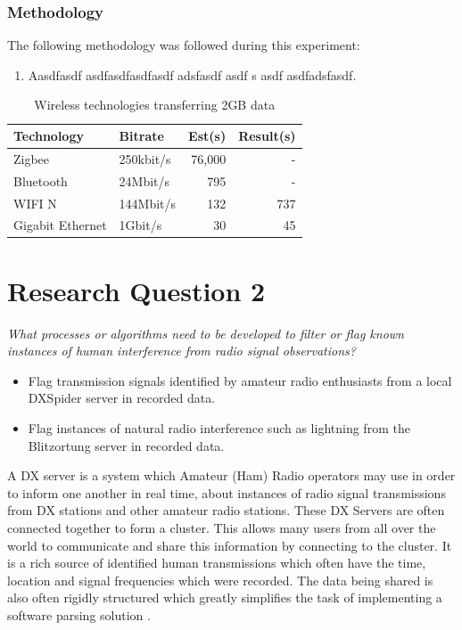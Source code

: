 \documentclass[runningheads,a4paper]{llncs}
\begin{document}
\subsection*{Methodology}
The following methodology was followed during this experiment:

\begin{enumerate}
	\item Aasdfasdf asdfasdfasdfasdf adsfasdf asdf s asdf  asdfadsfasdf. 
\end{enumerate}


%
\begin{table}
	\centering
	\begin{tabular}{p{3cm} l r r }
		\toprule
		Technology & Bitrate & Est(s) & Result(s)\\ \midrule
		Zigbee & 250kbit/s &  76,000 & - \\
		Bluetooth & 24Mbit/s & 795 & - \\
		WIFI N & 144Mbit/s & 132 & 737\\
		Gigabit Ethernet & 1Gbit/s & 30 & 45 \\
		\bottomrule
	\end{tabular}
	\caption{Wireless technologies transferring 2GB data}
	\label{tab:wireless_technologies_transfer_time}
\end{table}
%

%
%
\newpage
\chapter*{Research Question 2}

\textit{What processes or algorithms need to be developed to filter or flag known instances of human interference from radio signal observations?}

\begin{itemize}
	\item Flag transmission signals identified by amateur radio enthusiasts from a local DXSpider server in recorded data.
  	\item Flag instances of natural radio interference such as lightning from the Blitzortung server in recorded data.
\end{itemize}

A DX server is a system which Amateur (Ham) Radio operators may use in order to inform one another in real time, about instances of radio signal transmissions from DX stations and other amateur radio stations. These DX Servers are often connected together to form a cluster. This allows many users from all over the world to communicate and share this information by connecting to the cluster. It is a rich source of identified human transmissions which often have the time, location and signal frequencies which were recorded. The data being shared is also often rigidly structured which greatly simplifies the task of implementing a software parsing solution \citep{koopman-07}. 
\end{document}
